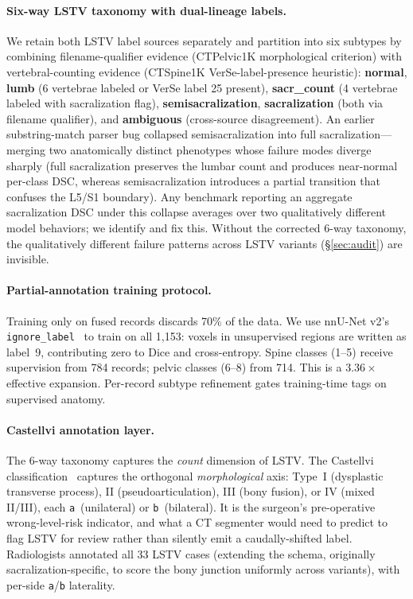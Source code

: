 \documentclass{article}
\newcommand{\VerSe}{VerSe}
\begin{document}
\paragraph{Six-way LSTV taxonomy with dual-lineage
labels.} We retain both LSTV label sources separately and
partition into six subtypes by combining filename-qualifier
evidence (CTPelvic1K morphological criterion) with
vertebral-counting evidence (CTSpine1K
\VerSe{}-label-presence heuristic):
\textbf{normal}, \textbf{lumb} (6 vertebrae labeled or
\VerSe{} label 25 present), \textbf{sacr\_count} (4
vertebrae labeled with sacralization flag),
\textbf{semisacralization}, \textbf{sacralization}
(both via filename qualifier), and \textbf{ambiguous}
(cross-source disagreement). An earlier substring-match
parser bug collapsed semisacralization into full
sacralization---merging two anatomically distinct
phenotypes whose failure modes diverge sharply (full
sacralization preserves the lumbar count and produces
near-normal per-class DSC, whereas semisacralization
introduces a partial transition that confuses the L5/S1
boundary). Any benchmark reporting an aggregate
sacralization DSC under this collapse averages over
two qualitatively different model behaviors; we identify
and fix this. Without the corrected 6-way taxonomy, the
qualitatively different failure patterns across LSTV
variants (\S\ref{sec:audit}) are invisible.

\paragraph{Partial-annotation training protocol.}
\label{sec:partial}
Training only on fused records discards 70\% of the data.
We use nnU-Net v2's
\texttt{ignore\_label}~\citep{Isensee2024Nnu-netSegmentation}
to train on all 1{,}153: voxels in unsupervised regions are
written as label~9, contributing zero to Dice and
cross-entropy. Spine classes (1--5) receive supervision
from 784 records; pelvic classes (6--8) from 714. This is a
$3.36\times$ effective expansion. Per-record subtype
refinement gates training-time tags on supervised anatomy.

\paragraph{Castellvi annotation layer.}
\label{sec:castellvi}
The 6-way taxonomy captures the \emph{count} dimension of
LSTV. The Castellvi
classification~\citep{Castellvi1984LumbosacralDefects}
captures the orthogonal \emph{morphological} axis:
Type~I (dysplastic transverse process), II
(pseudoarticulation), III (bony fusion), or IV (mixed
II/III), each \texttt{a}~(unilateral) or
\texttt{b}~(bilateral). It is the surgeon's
pre-operative wrong-level-risk indicator, and what a CT
segmenter would need to predict to flag LSTV for review
rather than silently emit a caudally-shifted label.
Radiologists annotated all 33 LSTV cases
(extending the schema, originally sacralization-specific,
to score the bony junction uniformly across variants),
with per-side \texttt{a}/\texttt{b} laterality.
\end{document}
